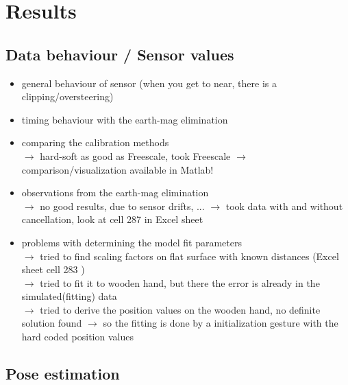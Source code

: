 \lhead[\chaptername~\thechapter]{\rightmark}

\rhead[\leftmark]{}

\lfoot[\thepage]{}

\cfoot{}

\rfoot[]{\thepage}

\chapter{Results} \label{cha:results}

\section{Data behaviour / Sensor values} \label{sec:dataRes}

\begin{itemize}
\item general behaviour of sensor (when you get to near, there is a clipping/oversteering)
\item timing behaviour with the earth-mag elimination

\item comparing the calibration methods \\
		$ \rightarrow $ hard-soft as good as Freescale, took Freescale
		$ \rightarrow $ comparison/visualization available in Matlab!
		
\item observations from the earth-mag elimination \\
		$ \rightarrow $ no good results, due to sensor drifts, ...
		$ \rightarrow $ took data with and without cancellation, look at cell 287 in Excel sheet 
		
\item problems with determining the model fit parameters \\
		$ \rightarrow $ tried to find scaling factors on flat surface with known distances (Excel sheet cell 283 ) \\
		$ \rightarrow $ tried to fit it to wooden hand, but there the error is already in the simulated(fitting) data \\
		$ \rightarrow $ tried to derive the position values on the wooden hand, no definite solution found
		$ \rightarrow $ so the fitting is done by a initialization gesture with the hard coded position values
		
\end{itemize}


\section{Pose estimation} \label{sec:estimationRes}

